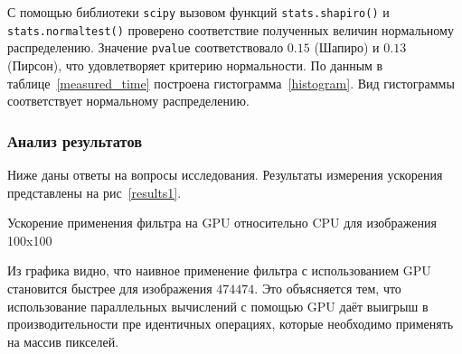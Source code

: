 \begin{table}[ht]
  \centering
\caption{Измерения, округленные до сотых значений, полученные во время работы параллельной версии алгоритма на графе \texttt{mycielskian12}, \texttt{parallelLevl} = $3$}\label{measured_time}
\end{table}

\noindent С помощью библиотеки \texttt{scipy} вызовом функций \texttt{stats.shapiro()} и \\
\texttt{stats.normaltest()} проверено соответствие полученных величин нормальному распределению. Значение \texttt{pvalue} соответствовало $0.15$ (Шапиро) и $0.13$ (Пирсон), что удовлетворяет критерию нормальности.
По данным в таблице~\ref{measured_time} построена гистограмма~\ref{histogram}. Вид гистограммы соответствует нормальному распределению.


\subsubsection*{Анализ результатов}
\noindent Ниже даны ответы на вопросы исследования.
Результаты измерения ускорения представлены на рис~\ref{results1}.

\begin{table}
  \centering

\caption{Ускорение применения фильтра на GPU относительно CPU для изображения 100x100}
\label{results1}
\end{table}

Из графика видно, что наивное применение фильтра с использованием GPU становится быстрее для изображения $474$\times$474$. Это объясняется тем, что использование параллельных вычислений с помощью GPU даёт выигрыш в производительности пре идентичных операциях, которые необходимо применять на массив пикселей.
